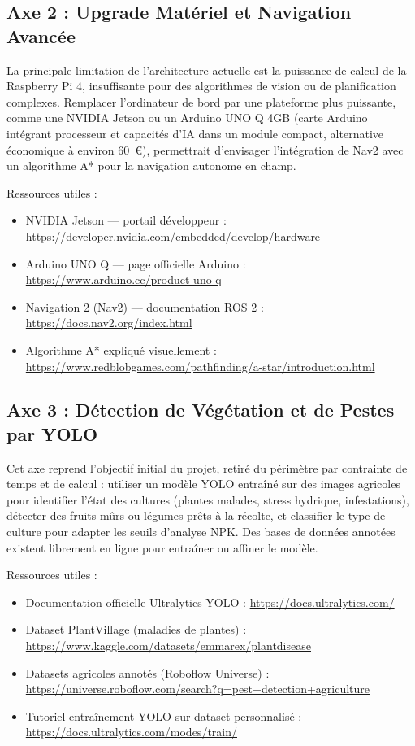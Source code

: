 \subsection{Axe 2 : Upgrade Matériel et Navigation Avancée}

La principale limitation de l'architecture actuelle est la puissance de calcul de la Raspberry Pi 4, insuffisante pour des algorithmes de vision ou de planification complexes. Remplacer l'ordinateur de bord par une plateforme plus puissante, comme une NVIDIA Jetson ou un Arduino UNO Q 4GB (carte Arduino intégrant processeur et capacités d'IA dans un module compact, alternative économique à environ 60~€), permettrait d'envisager l'intégration de Nav2 \cite{ros2_nav2} avec un algorithme A* pour la navigation autonome en champ.

\noindent Ressources utiles :
\begin{itemize}
    \item NVIDIA Jetson --- portail développeur : \url{https://developer.nvidia.com/embedded/develop/hardware}
    \item Arduino UNO Q --- page officielle Arduino : \url{https://www.arduino.cc/product-uno-q}
    \item Navigation 2 (Nav2) --- documentation ROS 2 : \url{https://docs.nav2.org/index.html}
    \item Algorithme A* expliqué visuellement : \url{https://www.redblobgames.com/pathfinding/a-star/introduction.html}
\end{itemize}

\subsection{Axe 3 : Détection de Végétation et de Pestes par YOLO}

Cet axe reprend l'objectif initial du projet, retiré du périmètre par contrainte de temps et de calcul : utiliser un modèle YOLO entraîné sur des images agricoles pour identifier l'état des cultures (plantes malades, stress hydrique, infestations), détecter des fruits mûrs ou légumes prêts à la récolte, et classifier le type de culture pour adapter les seuils d'analyse NPK. Des bases de données annotées existent librement en ligne pour entraîner ou affiner le modèle.

\noindent Ressources utiles :
\begin{itemize}
    \item Documentation officielle Ultralytics YOLO : \url{https://docs.ultralytics.com/}
    \item Dataset PlantVillage (maladies de plantes) : \url{https://www.kaggle.com/datasets/emmarex/plantdisease}
    \item Datasets agricoles annotés (Roboflow Universe) : \url{https://universe.roboflow.com/search?q=pest+detection+agriculture}
    \item Tutoriel entraînement YOLO sur dataset personnalisé : \url{https://docs.ultralytics.com/modes/train/}
\end{itemize}

